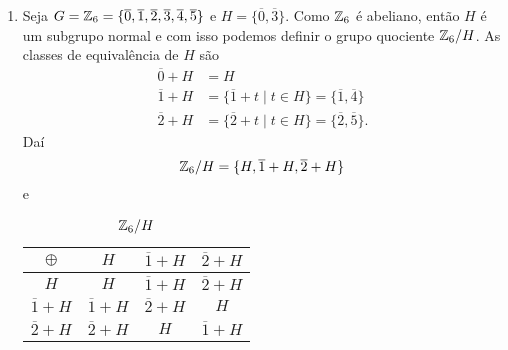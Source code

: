 \begin{exemplos}
\begin{enumerate}[label={\arabic*})]
        \item Seja $G = \mathbb{Z}_6 = \{\overline{0}, \overline{1}, \overline{2}, \overline{3}, \overline{4}, \overline{5}\}$ e $H = \{\overline{0}, \overline{3}\}$. Como $\mathbb{Z}_6$ é abeliano, então $H$ é um subgrupo normal e com isso podemos definir o grupo quociente $\mathbb{Z}_6/H$. As classes de equivalência de $H$ são
        \begin{align*}
            \overline{0} + H &= H\\
            \overline{1} + H &= \{\overline{1} + t \mid t \in H\} = \{\overline{1}, \overline{4}\}\\
            \overline{2} + H &= \{\overline{2} + t \mid t \in H\} = \{\overline{2}, \overline{5}\}.
        \end{align*}
        Daí
        \[
            \mathbb{Z}_6/H = \{H, \overline{1} + H, \overline{2} + H\}
        \]
        e
        \begin{center}
            \begin{table}[htp]
                \centering
                \caption{$\mathbb{Z}_6/H$}
                \begin{tabular}{|c|c|c|c|}
                    \hline
                    $\oplus$ & $H$ & $\overline{1} + H$ & $\overline{2} + H$\\
                    \hline
                    $H$ & $H$ & $\overline{1} + H$ & $\overline{2} + H$\\
                    \hline
                    $\overline{1} + H$ & $\overline{1} + H$ & $\overline{2} + H$ & $H$\\
                    \hline
                    $\overline{2} + H$ & $\overline{2} + H$ & $H$ & $\overline{1} + H$\\
                    \hline
                \end{tabular}
            \end{table}
        \end{center}



\end{enumerate}
\end{exemplos}
